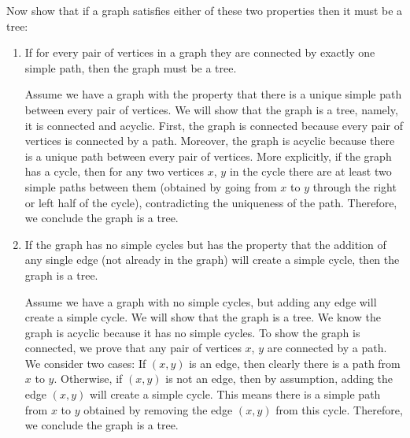 \question Now show that if a graph satisfies either of these two 
properties then it must be a tree:
\begin{enumerate}[label=\alph*]
\item If for every pair of vertices in a graph they are connected by 
exactly one simple path, then the graph must be a tree.
\begin{solution}[1.6 in]
Assume we have a graph with the property that there is a unique simple 
path between every pair of vertices. We will show that the graph is a 
tree, namely, it is connected and acyclic. First, the graph is connected 
because every pair of vertices is connected by a path. Moreover, the 
graph is acyclic because there is a unique path between every pair of 
vertices. More explicitly, if the graph has a cycle, then for any two 
vertices $x$, $y$ in the cycle there are at least two simple paths 
between them (obtained by going from $x$ to $y$ through the right or 
left half of the cycle), contradicting the uniqueness of the path. 
Therefore, we conclude the graph is a tree.
\end{solution}

\item If the graph has no simple cycles but has the property that the 
addition of any single edge (not already in the graph) will create a 
simple cycle, then the graph is a tree.
\begin{solution}
Assume we have a graph with no simple cycles, but adding any edge will 
create a simple cycle. We will show that the graph is a tree. We know 
the graph is acyclic because it has no simple cycles. To show the graph 
is connected, we prove that any pair of vertices $x$, $y$ are connected 
by a path. We consider two cases: If $(x, y)$ is an edge, then clearly 
there is a path from $x$ to $y$. Otherwise, if $(x,y)$ is not an edge, 
then by assumption, adding the edge $(x,y)$ will create a simple cycle. 
This means there is a simple path from $x$ to $y$ obtained by removing 
the edge $(x, y)$ from this cycle. Therefore, we conclude the graph is 
a tree.
\end{solution}
\end{enumerate}

\clearpage